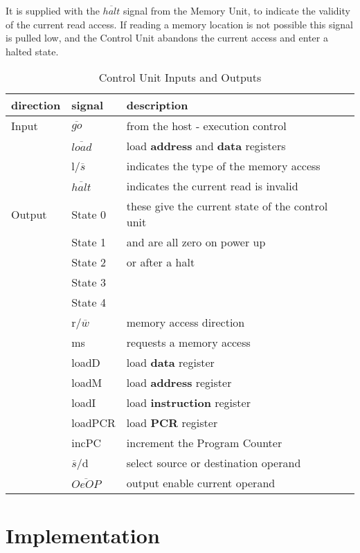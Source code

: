 It is supplied with the $\overline{halt}$ signal from the Memory Unit, to indicate the validity of the current read access. 
If  reading a memory location is not possible this signal  is  pulled low, and the Control Unit  abandons the current access and enter a halted state.
\begin{table}
\center
\begin{tabular}{||l|ll||}
\hline
direction & signal &  description \\
\hline 
Input 
& $\overline{go}$ &  from the host - execution control\\
 & $\overline{load}$   & load {\bf address} and {\bf data} registers\\
 & l/$\overline{s}$ &  indicates the type of the memory access\\
 & $\overline{halt}$	 & indicates the current read is invalid\\
\hline

Output
  & State 0 & these give the current state of the control unit\\
 & State 1 &   and are all zero on power up\\
 & State 2 &   or after a halt\\
 & State 3 &  \\
 & State 4 &  \\
 & r/$\overline{w}$ & memory access direction\\
 & ms & requests a memory access\\
 & loadD & load {\bf data} register\\
 & loadM & load {\bf address} register\\
 & loadI & load {\bf instruction} register\\
 & loadPCR & load {\bf PCR} register\\
 & incPC & increment the Program Counter\\
 & $\overline{s}$/d & select source or destination operand\\
 & $\overline{OeOP}$  & output  enable current operand\\
 \hline
 \end{tabular}
 \caption{Control Unit Inputs and Outputs}
 \label{table:control}
 \end{table}
 
\section{Implementation}

